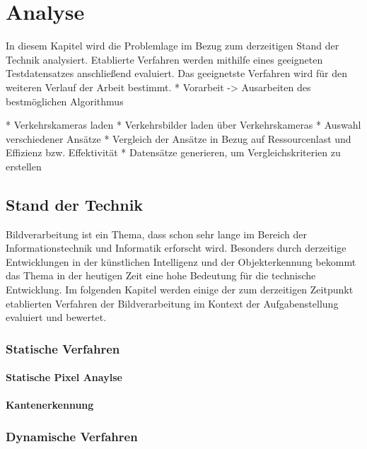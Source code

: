 \chapter{Analyse}
In diesem Kapitel wird die Problemlage im Bezug zum derzeitigen Stand der Technik analysiert.
Etablierte Verfahren werden mithilfe eines geeigneten Testdatensatzes anschließend evaluiert.
Das geeignetste Verfahren wird für den weiteren Verlauf der Arbeit bestimmt.
* Vorarbeit -> Ausarbeiten des bestmöglichen Algorithmus\newline

* Verkehrskameras laden\newline
* Verkehrsbilder laden über Verkehrskameras\newline
* Auswahl verschiedener Ansätze\newline
* Vergleich der Ansätze in Bezug auf Ressourcenlast und Effizienz bzw. Effektivität\newline
* Datensätze generieren, um Vergleichskriterien zu erstellen\newline

\section{Stand der Technik}
Bildverarbeitung ist ein Thema, dass schon sehr lange im Bereich der Informationstechnik und Informatik erforscht wird.
Besonders durch derzeitige Entwicklungen in der künstlichen Intelligenz und der Objekterkennung bekommt das Thema in der heutigen Zeit eine hohe Bedeutung für die technische Entwicklung. Im folgenden Kapitel werden einige der zum derzeitigen Zeitpunkt etablierten Verfahren der Bildverarbeitung im Kontext der Aufgabenstellung evaluiert und bewertet.

\subsection{Statische Verfahren}
\subsubsection{Statische Pixel Anaylse}
\cite{bin2001vehicle}
\subsubsection{Kantenerkennung}
\cite{crouzil2016automatic}
\cite{gupte2000algorithms}
\subsection{Dynamische Verfahren}
